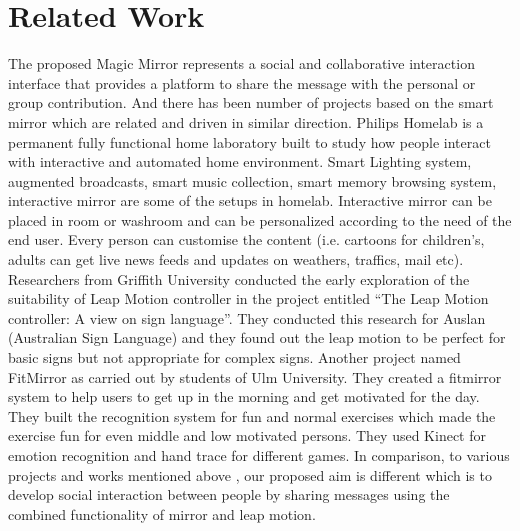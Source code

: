 \section{Related Work}
The proposed Magic Mirror represents a social and collaborative interaction interface that provides a platform to share the message with the personal or group contribution. And there has been number of projects based on the smart mirror which are related and driven in similar direction. Philips Homelab is a permanent fully functional home laboratory built to study how people interact with interactive and automated home environment. Smart Lighting system, augmented broadcasts, smart music collection, smart memory browsing system, interactive mirror are some of the setups in homelab. Interactive mirror can be placed in room or washroom and can be personalized according to the need of the end user. Every person can customise the content (i.e. cartoons for children’s, adults can get live news feeds and updates on weathers, traffics, mail etc).
Researchers from Griffith University conducted the early exploration of the suitability of Leap Motion controller in the project entitled “The Leap Motion controller: A view on sign language”. They conducted this research for Auslan (Australian Sign Language) and they found out the leap motion to be perfect for basic signs but not appropriate for complex signs.
Another project named FitMirror as carried out by students of Ulm University. They created a fitmirror system to help users to get up in the morning and get motivated for the day. They built the recognition system for fun and normal exercises which made the exercise fun for even middle and low motivated persons. They used Kinect for emotion recognition and hand trace for different games.
In comparison, to various projects and works mentioned above , our proposed aim is different which is to develop social interaction between people by sharing messages using the combined functionality of mirror and leap motion.